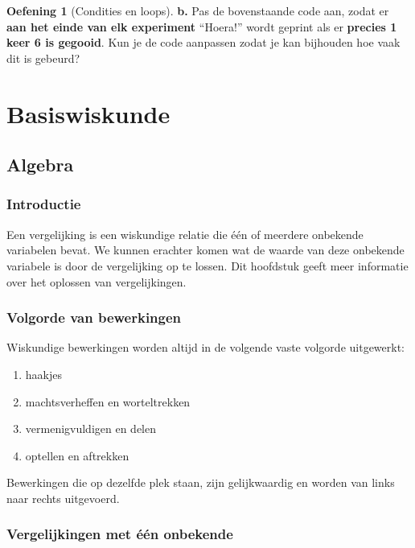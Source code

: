 \documentclass[
  a4paper,
]{scrbook}
\theoremstyle{definition}
\newtheorem{exercise}{Oefening}[chapter]
\theoremstyle{remark}
\begin{document}
\begin{exercise}[Condities en
loops]
\textbf{b.} Pas de bovenstaande code aan, zodat er \textbf{aan het einde
van elk experiment} ``Hoera!'' wordt geprint als er \textbf{precies 1
keer 6 is gegooid}. Kun je de code aanpassen zodat je kan bijhouden hoe
vaak dit is gebeurd?

\end{exercise}

\part{Basiswiskunde}

\chapter{Algebra}\label{sec-algebra}

\section{Introductie}\label{introductie}

Een vergelijking is een wiskundige relatie die één of meerdere onbekende
variabelen bevat. We kunnen erachter komen wat de waarde van deze
onbekende variabele is door de vergelijking op te lossen. Dit hoofdstuk
geeft meer informatie over het oplossen van vergelijkingen.

\section{Volgorde van bewerkingen}\label{volgorde-van-bewerkingen}

Wiskundige bewerkingen worden altijd in de volgende vaste volgorde
uitgewerkt:

\begin{enumerate}
\def\labelenumi{\arabic{enumi}.}
\item
  haakjes
\item
  machtsverheffen en worteltrekken
\item
  vermenigvuldigen en delen
\item
  optellen en aftrekken
\end{enumerate}

Bewerkingen die op dezelfde plek staan, zijn gelijkwaardig en worden van
links naar rechts uitgevoerd.

\section{Vergelijkingen met één
onbekende}\label{vergelijkingen-met-uxe9uxe9n-onbekende}
\end{document}
